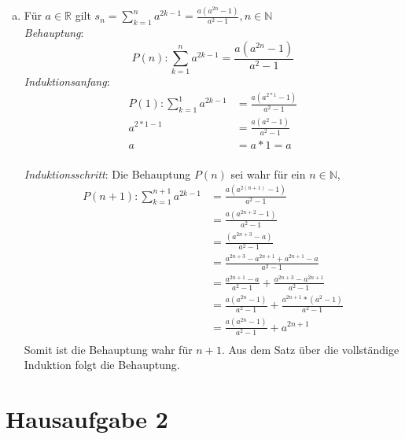\documentclass{article}
\begin{document}
\begin{enumerate}[a)]
\newpage
\item Für $a \in \mathbb{R}$ gilt $s_n = \sum\limits_{k = 1}^n a^{2k - 1} = \frac{a(a^{2n} - 1)}{a^2 - 1}, n \in \mathbb{N}$ \\
  \emph{Behauptung}:
  \[
    P(n) \colon \sum\limits_{k = 1}^n a^{2k - 1} = \frac{a(a^{2n} - 1)}{a^2 - 1} 
  \]
  \emph{Induktionsanfang}:
  \begin{align*}
    P(1) \colon \sum\limits_{k = 1}^1 a^{2k - 1} &= \frac{a(a^{2 * 1} - 1)}{a^2 - 1}  \\
                                   a^{2 * 1 - 1} &= \frac{a(a^2 - 1)}{a^2 - 1}  \\
                                               a &= a * 1 = a \\
  \end{align*}

  \emph{Induktionsschritt}:  Die Behauptung $P(n)$ sei wahr für ein $n \in \mathbb{N}$,
  \begin{align*}
    P(n + 1) \colon \sum\limits_{k = 1}^{n + 1} a^{2k - 1} &= \frac{a(a^{2(n + 1)} - 1)}{a^2 - 1}  \\
                                                           &= \frac{a(a^{2n + 2} - 1)}{a^2 - 1}  \\
                                                           &= \frac{(a^{2n + 3} - a)}{a^2 - 1}  \\   
                                                           &= \frac{a^{2n + 3} - a^{2n + 1} + a^{2n + 1} - a}{a^2 - 1} \\
                                                           &= \frac{a^{2n + 1} - a}{a^2 - 1} + \frac{a^{2n + 3} - a^{2n + 1}}{a^2 - 1}  \\
                                                           &= \frac{a(a^{2n} - 1)}{a^2 - 1} + \frac{a^{2n + 1} * (a^2 - 1)}{a^2 - 1}  \\
                                                           &= \frac{a(a^{2n} - 1)}{a^2 - 1} + a^{2n + 1}  \\
  \end{align*}
  Somit ist die Behauptung wahr für $n + 1$. Aus dem Satz über die vollständige Induktion folgt die Behauptung.
\end{enumerate}

\newpage
\section*{Hausaufgabe 2}
\end{document}
